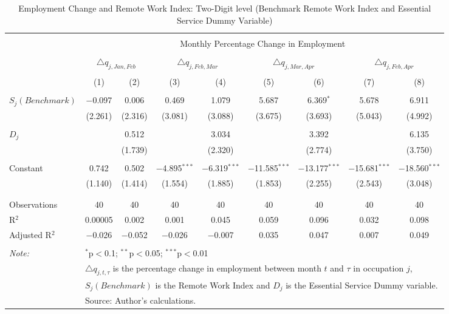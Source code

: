 
\begin{table}[!htbp] \centering 
  \caption{Employment Change and Remote Work Index: Two-Digit level (Benchmark Remote Work Index and Essential Service Dummy Variable)} 
  \label{tab:regression_dynamics_2digit} 
\footnotesize 
\begin{tabular}{@{\extracolsep{5pt}}lcccccccc} 
\\[-1.8ex]\hline 
\hline \\[-1.8ex] 
 & \multicolumn{8}{c}{Monthly Percentage Change in Employment} \\ 
\cline{2-9} 
\\[-1.8ex] & \multicolumn{2}{c}{$\triangle q_{j,Jan,Feb}$} & \multicolumn{2}{c}{$\triangle q_{j,Feb,Mar}$} & \multicolumn{2}{c}{$\triangle q_{j,Mar,Apr}$} & \multicolumn{2}{c}{$\triangle q_{j,Feb,Apr}$} \\ 
\\[-1.8ex] & (1) & (2) & (3) & (4) & (5) & (6) & (7) & (8)\\ 
\hline \\[-1.8ex] 
 $S_{j} (Benchmark)$ & $-$0.097 & 0.006 & 0.469 & 1.079 & 5.687 & 6.369$^{*}$ & 5.678 & 6.911 \\ 
  & (2.261) & (2.316) & (3.081) & (3.088) & (3.675) & (3.693) & (5.043) & (4.992) \\ 
  & & & & & & & & \\ 
 $D_{j}$ &  & 0.512 &  & 3.034 &  & 3.392 &  & 6.135 \\ 
  &  & (1.739) &  & (2.320) &  & (2.774) &  & (3.750) \\ 
  & & & & & & & & \\ 
 Constant & 0.742 & 0.502 & $-$4.895$^{***}$ & $-$6.319$^{***}$ & $-$11.585$^{***}$ & $-$13.177$^{***}$ & $-$15.681$^{***}$ & $-$18.560$^{***}$ \\ 
  & (1.140) & (1.414) & (1.554) & (1.885) & (1.853) & (2.255) & (2.543) & (3.048) \\ 
  & & & & & & & & \\ 
\hline \\[-1.8ex] 
Observations & 40 & 40 & 40 & 40 & 40 & 40 & 40 & 40 \\ 
R$^{2}$ & 0.00005 & 0.002 & 0.001 & 0.045 & 0.059 & 0.096 & 0.032 & 0.098 \\ 
Adjusted R$^{2}$ & $-$0.026 & $-$0.052 & $-$0.026 & $-$0.007 & 0.035 & 0.047 & 0.007 & 0.049 \\ 
\hline 
\hline \\[-1.8ex] 
\textit{Note:}  & \multicolumn{8}{l}{$^{*}$p$<$0.1; $^{**}$p$<$0.05; $^{***}$p$<$0.01} \\ 
 & \multicolumn{8}{l}{$\triangle q_{j,t,\tau}$ is the percentage change in employment between month $t$ and $\tau$ in occupation $j$,} \\ 
 & \multicolumn{8}{l}{$S_{j} (Benchmark)$ is the Remote Work Index and $D_{j}$ is the Essential Service Dummy variable.} \\ 
 & \multicolumn{8}{l}{Source: Author's calculations.} \\ 
\end{tabular} 
\end{table} 
